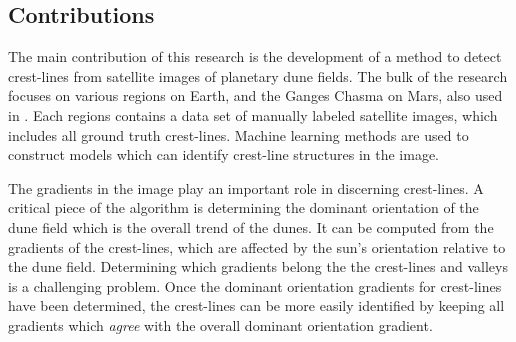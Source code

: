 \subsection{Contributions}

The main contribution of this research is the development of a method to detect crest-lines from satellite images of planetary dune fields. The bulk of the research focuses on various regions on Earth, and the Ganges Chasma on Mars, also used in \cite{vaz_object_based_dune_analysis}. Each regions contains a data set of manually labeled satellite images, which includes all ground truth crest-lines. Machine learning methods are used to construct models which can identify crest-line structures in the image.


The gradients in the image play an important role in discerning crest-lines. A critical piece of the algorithm is determining the dominant orientation of the dune field which is the overall trend of the dunes. It can be computed from the gradients of the crest-lines, which are affected by the sun's orientation relative to the dune field. Determining which gradients belong the the crest-lines and valleys is a challenging problem. Once the dominant orientation gradients for crest-lines have been determined, the crest-lines can be more easily identified by keeping all gradients which \emph{agree} with the overall dominant orientation gradient. %

